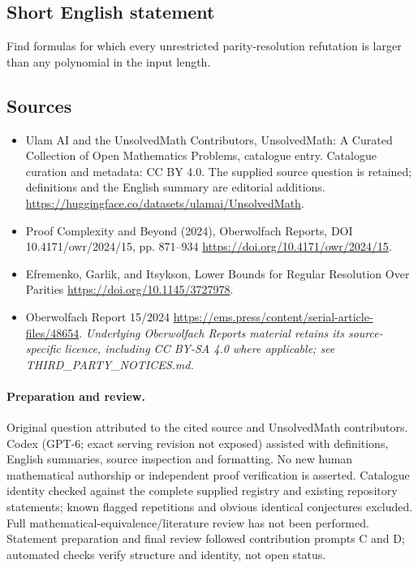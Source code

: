 \documentclass[11pt]{article}
\begin{document}
\subsection{Short English statement}
Find formulas for which every unrestricted parity-resolution refutation is larger than any polynomial in the input length.
\subsection{Sources}
\begin{itemize}
\item[\hypertarget{source:statement:1}{S1}] Ulam AI and the UnsolvedMath Contributors, UnsolvedMath: A Curated Collection of Open Mathematics Problems, catalogue entry. Catalogue curation and metadata: CC BY 4.0. The supplied source question is retained; definitions and the English summary are editorial additions.
\url{https://huggingface.co/datasets/ulamai/UnsolvedMath}.
\item[\hypertarget{source:statement:2}{S2}] Proof Complexity and Beyond (2024), Oberwolfach Reports, DOI 10.4171/owr/2024/15, pp. 871--934
\url{https://doi.org/10.4171/owr/2024/15}.
\item[\hypertarget{source:statement:3}{S3}] Efremenko, Garlik, and Itsykson, Lower Bounds for Regular Resolution Over Parities
\url{https://doi.org/10.1145/3727978}.
\item[\hypertarget{source:statement:4}{S4}] Oberwolfach Report 15/2024
\url{https://ems.press/content/serial-article-files/48654}.
\textit{Underlying Oberwolfach Reports material retains its source-specific licence, including CC BY-SA 4.0 where applicable; see THIRD\_PARTY\_NOTICES.md.}
\end{itemize}
\paragraph{Preparation and review.}
Original question attributed to the cited source and UnsolvedMath contributors. Codex (GPT-6; exact serving revision not exposed) assisted with definitions, English summaries, source inspection and formatting. No new human mathematical authorship or independent proof verification is asserted. Catalogue identity checked against the complete supplied registry and existing repository statements; known flagged repetitions and obvious identical conjectures excluded. Full mathematical-equivalence/literature review has not been performed. Statement preparation and final review followed contribution prompts C and D; automated checks verify structure and identity, not open status.
\label{end:statement}
\end{document}
